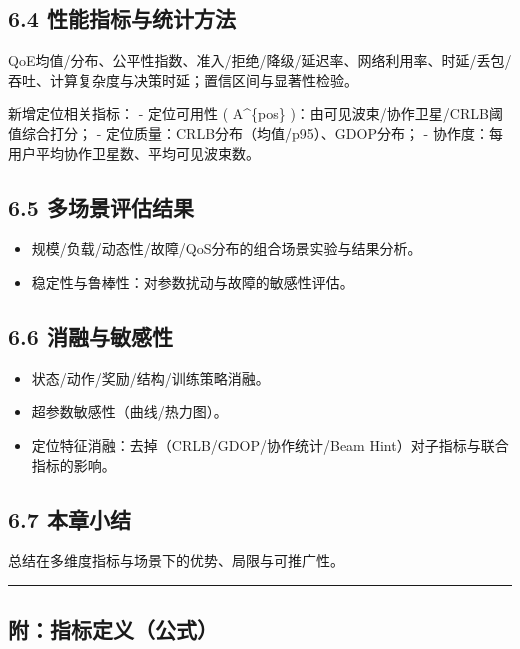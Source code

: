 \subsection{6.4
性能指标与统计方法}\label{ux6027ux80fdux6307ux6807ux4e0eux7edfux8ba1ux65b9ux6cd5}

QoE均值/分布、公平性指数、准入/拒绝/降级/延迟率、网络利用率、时延/丢包/吞吐、计算复杂度与决策时延；置信区间与显著性检验。

新增定位相关指标： - 定位可用性 ( A\^{}\{pos\}
\in [0,1] )：由可见波束/协作卫星/CRLB阈值综合打分； -
定位质量：CRLB分布（均值/p95）、GDOP分布； -
协作度：每用户平均协作卫星数、平均可见波束数。

\subsection{6.5
多场景评估结果}\label{ux591aux573aux666fux8bc4ux4f30ux7ed3ux679c}

\begin{itemize}
\tightlist
\item
  规模/负载/动态性/故障/QoS分布的组合场景实验与结果分析。
\item
  稳定性与鲁棒性：对参数扰动与故障的敏感性评估。
\end{itemize}

\subsection{6.6
消融与敏感性}\label{ux6d88ux878dux4e0eux654fux611fux6027}

\begin{itemize}
\tightlist
\item
  状态/动作/奖励/结构/训练策略消融。
\item
  超参数敏感性（曲线/热力图）。
\item
  定位特征消融：去掉（CRLB/GDOP/协作统计/Beam
  Hint）对子指标与联合指标的影响。
\end{itemize}

\subsection{6.7 本章小结}\label{ux672cux7ae0ux5c0fux7ed3-1}

总结在多维度指标与场景下的优势、局限与可推广性。

\begin{center}\rule{0.5\linewidth}{0.5pt}\end{center}

\subsection{附：指标定义（公式）}\label{ux9644ux6307ux6807ux5b9aux4e49ux516cux5f0f}

